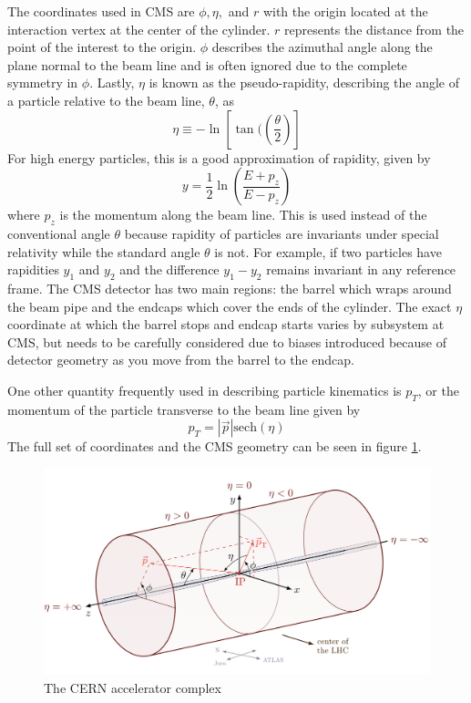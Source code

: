 The coordinates used in CMS are $\phi, \eta,$ and $r$ with the origin located at the interaction vertex at the center of the cylinder. $r$ represents the distance from the point of the interest to the origin. $\phi$ describes the azimuthal angle along the plane normal to the beam line and is often ignored due to the complete symmetry in $\phi$. Lastly, $\eta$ is known as the pseudo-rapidity, describing the angle of a particle relative to the beam line, $\theta$, as
\begin{equation}
    \eta \equiv -\ln\left[ \tan(\left(\frac{\theta}{2}\right) \right]
\end{equation}
For high energy particles, this is a good approximation of rapidity, given by
\begin{equation}
    y = \frac{1}{2} \ln\left( \frac{E + p_z}{E-p_z}\right)
\end{equation}
where $p_z$ is the momentum along the beam line. This is used instead of the conventional angle $\theta$ because rapidity of particles are invariants under special relativity while the standard angle $\theta$ is not. For example, if two particles have rapidities $y_1$ and $y_2$ and the difference $y_1 - y_2$ remains invariant in any reference frame. The CMS detector has two main regions: the barrel which wraps around the beam pipe and the endcaps which cover the ends of the cylinder. The exact $\eta$ coordinate at which the barrel stops and endcap starts varies by subsystem at CMS, but needs to be carefully considered due to biases introduced because of detector geometry as you move from the barrel to the endcap. 

One other quantity frequently used in describing particle kinematics is $p_T$, or the momentum of the particle transverse to the beam line given by
\begin{equation}
    p_T = |\vec{p}|\text{sech}(\eta)
\end{equation}
The full set of coordinates and the CMS geometry can be seen in figure \ref{fig:cms-coordinate-system}.

\begin{figure}[hb!]
    \centering
    \includegraphics[width=1.0\textwidth]{figures/chapter3/CMS-coordinate-system.png}
    \caption{The CERN accelerator complex}
    \label{fig:cms-coordinate-system}
\end{figure}



